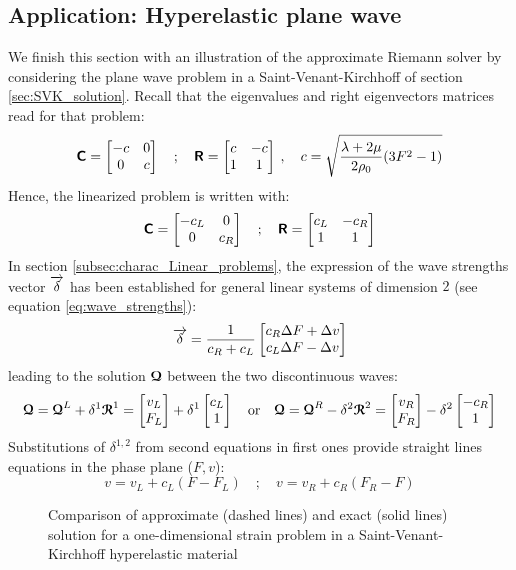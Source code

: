 \subsection{Application: Hyperelastic plane wave}
We finish this section with an illustration of the approximate Riemann solver by considering the plane wave problem in a Saint-Venant-Kirchhoff of section \ref{sec:SVK_solution}.
Recall that the eigenvalues and right eigenvectors matrices read for that problem:
\begin{equation}
  \label{eq:SVK_matrices}
  \boldsymbol{\mathsf{C}} = \left[\begin{matrix}-c & 0 \\ 0 & c\end{matrix}\right] \quad ; \quad \boldsymbol{\mathsf{R}} = \left[\begin{matrix}c & -c\\ 1&1\end{matrix}\right] \:,\quad c=\sqrt{\frac{\lambda + 2\mu}{2\rho_0}(3F^2-1)}
\end{equation}
Hence, the linearized problem is written with:
\begin{equation}
  \label{eq:SVK_matrices_linear}
  \boldsymbol{\mathsf{C}} = \left[\begin{matrix}-c_L & 0 \\ 0 & c_R\end{matrix}\right] \quad ; \quad \boldsymbol{\mathsf{R}} = \left[\begin{matrix}c_L & -c_R\\ 1&1\end{matrix}\right]
\end{equation}
In section \ref{subsec:charac_Linear_problems}, the expression of the wave strengths vector ${\overrightarrow{\delta}}$ has been established for general linear systems of dimension $2$ (see equation \eqref{eq:wave_strengths}):
\begin{equation}
  {\overrightarrow{\delta}}=\frac{1}{c_R+c_L}\left[\begin{matrix}c_R \Delta F +\Delta v\\ c_L \Delta F -\Delta v\end{matrix}\right]
\end{equation}
leading to the solution ${\boldsymbol{\mathcal{Q}}} $ between the two discontinuous waves:
\begin{equation}
  \label{eq:SVK_approx_solution}
  {\boldsymbol{\mathcal{Q}}}  = {\boldsymbol{\mathcal{Q}}}^L + \delta^1 {\boldsymbol{\mathcal{R}}}^1 = \left[\begin{matrix}v_L \\F_L\end{matrix}\right] +\delta^1 \left[\begin{matrix}c_L \\1\end{matrix}\right] \quad \text{or} \quad {\boldsymbol{\mathcal{Q}}}  = {\boldsymbol{\mathcal{Q}}}^R - \delta^2 {\boldsymbol{\mathcal{R}}}^2 = \left[\begin{matrix}v_R \\F_R\end{matrix}\right] -\delta^2 \left[\begin{matrix}-c_R \\1\end{matrix}\right]
\end{equation}
Substitutions of $\delta^{1,2}$ from second equations in first ones provide straight lines equations in the phase plane ($F,v$):
\begin{equation}
  \label{eq:approx_straight}
  v  = v_L + c_L(F -F_L) \quad ; \quad v  = v_R + c_R(F_R-F )
\end{equation}
\begin{figure}[h!]
  \centering
  {  \label{subfig:SVK_Approx1}}
  {  \label{subfig:SVK_Approx4}}
  \caption{Comparison of approximate (dashed lines) and exact (solid lines) solution for a one-dimensional strain problem in a Saint-Venant-Kirchhoff hyperelastic material}
  \label{fig:comparison_exact_approx}
\end{figure}

